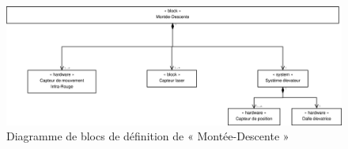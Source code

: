 \begin{figure}[H]
	\centering
	\includegraphics[width=1.0\linewidth]{diagrams/bathroom/diagramme_blocks_bdd2.eps}
	\caption{Diagramme de blocs de définition de « Montée-Descente »}
	\label{fig:diagramme_bdd2}
\end{figure}
